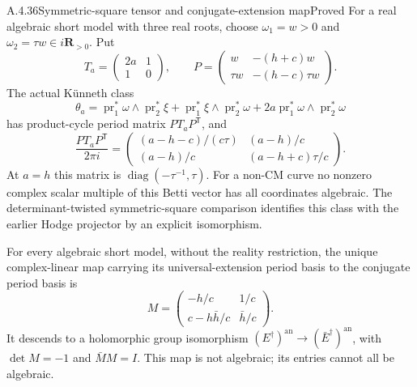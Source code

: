 \begin{result}{A.4.36}{Symmetric-square tensor and conjugate-extension map}{Proved}
For a real algebraic short model with three real roots, choose
$\omega_1=w>0$ and $\omega_2=\tau w\in i\mathbf R_{>0}$.
Put
\[
 T_a=\begin{pmatrix}2a&1\\1&0\end{pmatrix},\qquad
 P=\begin{pmatrix}w&-(h+c)w\\ \tau w&-(h-c)\tau w\end{pmatrix}.
\]
The actual K\"unneth class
\[
 \theta_a=\operatorname{pr}_1^*\omega\wedge\operatorname{pr}_2^*\xi
 +\operatorname{pr}_1^*\xi\wedge\operatorname{pr}_2^*\omega
 +2a\operatorname{pr}_1^*\omega\wedge\operatorname{pr}_2^*\omega
\]
has product-cycle period matrix $PT_aP^{\mathsf T}$, and
\[
 \frac{PT_aP^{\mathsf T}}{2\pi i}
 =\begin{pmatrix}
 (a-h-c)/(c\tau)&(a-h)/c\\
 (a-h)/c&(a-h+c)\tau/c
 \end{pmatrix}.
\]
At $a=h$ this matrix is $\operatorname{diag}(-\tau^{-1},\tau)$.
For a non-CM curve no nonzero complex scalar multiple of this Betti
vector has all coordinates algebraic. The determinant-twisted
symmetric-square comparison identifies this class with the earlier
Hodge projector by an explicit isomorphism.

For every algebraic short model, without the reality restriction,
the unique complex-linear map carrying its universal-extension
period basis to the conjugate period basis is
\[
 M=\begin{pmatrix}
 -h/c&1/c\\ c-h\bar h/c&\bar h/c
 \end{pmatrix}.
\]
It descends to a holomorphic group isomorphism
$(E^\dagger)^{\mathrm{an}}\to(\bar E^\dagger)^{\mathrm{an}}$, with
$\det M=-1$ and $\bar M M=I$. This map is not algebraic; its entries
cannot all be algebraic.
\end{result}


